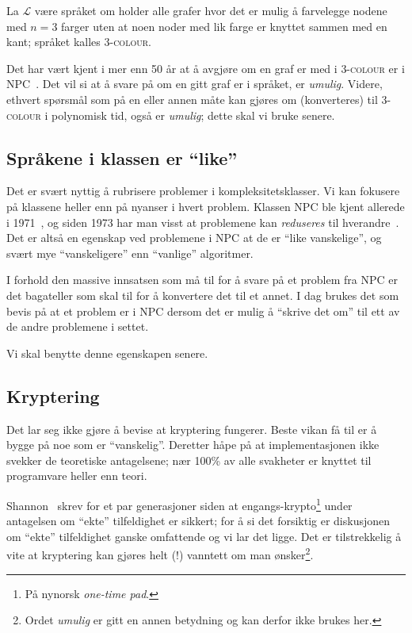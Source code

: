 \documentclass[a4paper, parskip=half]{scrartcl}
\theoremstyle{definition}
\begin{document}
La $\mathcal{L}$ være språket om holder alle grafer hvor det er mulig å
farvelegge nodene med $n=3$ farger uten at noen noder med lik farge
er knyttet sammen med en kant; språket kalles \textsc{3-colour}.

Det har vært kjent i mer enn 50 år at å avgjøre om en graf er med i
\textsc{3-colour} er i \textsf{NPC}~\cite{Karp1972Reducibility, 
GareyJohnson1979}.  Det vil si at å svare på om en gitt graf er i
språket, er \emph{umulig}.  Videre, ethvert spørsmål som på en eller
annen måte kan gjøres om (konverteres) til \textsc{3-colour} i
polynomisk tid, også er \emph{umulig}; dette skal vi bruke senere.


%
%
\subsection{Språkene i klassen er ``like''}

Det er svært nyttig å rubrisere problemer i kompleksitets\-klasser.
Vi kan fokusere på
klassene heller enn på nyanser i hvert problem.  
Klassen \textsf{NPC} ble kjent allerede i
1971~\cite{Cook1971Theorem}, og siden 1973 har man visst at problemene
kan \emph{reduseres} til hverandre~\cite{Karp1972Reducibility}.  Det
er altså en egenskap ved problemene i \textsf{NPC} at de er ``like
vanskelige'', og svært mye ``vanskeligere'' enn ``vanlige''
algoritmer.

I forhold den massive innsatsen som må til for å svare på et problem
fra \textsf{NPC} er det bagateller som skal til for å konvertere
det til et annet.  I dag brukes det som bevis på at et problem er i
\textsf{NPC} dersom det er mulig å ``skrive det om'' til ett av de
andre problemene i settet.

Vi skal benytte denne egenskapen senere.



%
%
\subsection{Kryptering}
\label{sec:krypto}

Det lar seg ikke gjøre å bevise at kryptering fungerer.  Beste vikan
få til er å bygge på noe som er ``vanskelig''.
Deretter håpe på at implementasjonen ikke svekker de teoretiske
antagelsene; nær 100\% av alle svakheter er knyttet til programvare
heller enn teori.

Shannon~\cite{Shannon1949Communication} skrev for et par generasjoner
siden at engangs-krypto\footnote{På nynorsk \emph{one-time pad}.}
under antagelsen om ``ekte'' tilfeldighet er sikkert; for å
si det forsiktig er diskusjonen om ``ekte'' tilfeldighet ganske
omfattende og vi lar det ligge.  Det er tilstrekkelig å vite at
kryptering kan gjøres helt (!) vanntett om man ønsker\footnote{Ordet
\emph{umulig} er gitt en annen betydning og kan derfor ikke brukes
her.}.
\end{document}
